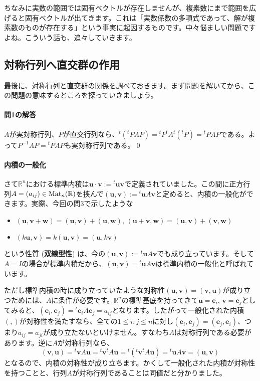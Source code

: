 ちなみに実数の範囲では固有ベクトルが存在しませんが、複素数にまで範囲を広げると固有ベクトルが出てきます。これは「実数係数の多項式であって、解が複素数のものが存在する」という事実に起因するものです。中々悩ましい問題ですよね。こういう話も、追々していきます。

\subsection{対称行列へ直交群の作用}

最後に、対称行列と直交群の関係を調べておきます。まず問題を解いてから、この問題の意味するところを探っていきましょう。

\paragraph{問1の解答}

$A$が実対称行列、$P$が直交行列なら、${}^t({}^tP AP) = {}^tP {}^tA {}^t({}^tP) = {}^tP AP$である。よって$P^{-1}AP = {}^tP AP$も実対称行列である。\qed

\paragraph{内積の一般化}

さて$\mathbb{R}^n$における標準内積は$\bm{u} \cdot \bm{v} := {}^t\bm{u} \bm{v}$で定義されていました。この間に正方行列$A = (a_{ij}) \in \operatorname{Mat}_n(\mathbb{R})$を挟んで$(\bm{u}, \bm{v}) := {}^t\bm{u} A \bm{v}$と定めると、内積の一般化ができます。実際、今回の問3で示したような
\begin{itemize}
\item $(\bm{u}, \bm{v} + \bm{w}) = (\bm{u}, \bm{v}) + (\bm{u}, \bm{w})$, $(\bm{u} + \bm{v}, \bm{w}) = (\bm{u}, \bm{v}) + (\bm{v}, \bm{w})$
\item $(k\bm{u}, \bm{v}) = k(\bm{u}, \bm{v}) = (\bm{u}, k\bm{v})$
\end{itemize}
という性質 (\textbf{双線型性}) は、今の$(\bm{u}, \bm{v}) := {}^t\bm{u} A \bm{v}$でも成り立っています。そして$A = I$の場合が標準内積だから、$(\bm{u}, \bm{v}) = {}^t\bm{u} A \bm{v}$は標準内積の一般化と呼ばれています。


ただし標準内積の時に成り立っていたような対称性$(\bm{u}, \bm{v}) = (\bm{v}, \bm{u})$が成り立つためには、$A$に条件が必要です。$\mathbb{R}^n$の標準基底を持ってきて$\bm{u} = \bm{e}_i$, $\bm{v} = \bm{e}_j$としてみると、$(\bm{e}_i, \bm{e}_j) = {}^t\bm{e}_i A \bm{e}_j = a_{ij}$となります。したがって一般化された内積$(, )$が対称性を満たすなら、全ての$1 \leq i, j \leq n$に対し$(\bm{e}_i, \bm{e}_j) = (\bm{e}_j, \bm{e}_i)$、つまり$a_{ij} = a_{ji}$が成り立たないといけません。すなわち$A$は対称行列である必要があります。逆に$A$が対称行列なら、
\[
(\bm{v}, \bm{u}) = {}^t\bm{v} A \bm{u} = {}^t\bm{v} {}^t\!A \bm{u}
= {}^t({}^t\bm{v} {}^t\!A \bm{u}) = {}^t\bm{u} A \bm{v} = (\bm{u}, \bm{v})
\]
となるので、内積の対称性が成り立ちます。かくして一般化された内積が対称性を持つことと、行列$A$が対称行列であることは同値だと分かりました。

